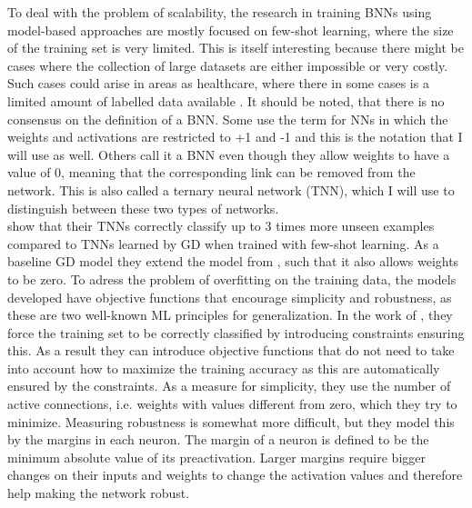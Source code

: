 \noindent To deal with the problem of scalability, the research in training BNNs using model-based approaches are mostly focused on few-shot learning, where the size of the training set is very limited. This is itself interesting because there might be cases where the collection of large datasets are either impossible or very costly. Such cases could arise in areas as healthcare, where there in some cases is a limited amount of labelled data available \citep{ching2017}. It should be noted, that there is no consensus on the definition of a BNN. Some use the term for NNs in which the weights and activations are restricted to +1 and -1 and this is the notation that I will use as well. Others call it a BNN even though they allow weights to have a value of 0, meaning that the corresponding link can be removed from the network. This is also called a ternary neural network (TNN), which I will use to distinguish between these two types of networks. \\

\noindent \cite{icarte2019} show that their TNNs correctly classify up to 3 times more unseen examples compared to TNNs learned by GD when trained with few-shot learning. As a baseline GD model they extend the model from \cite{Hubara2016}, such that it also allows weights to be zero. To adress the problem of overfitting on the training data, the models developed have objective functions that encourage simplicity and robustness, as these are two well-known ML principles for generalization. In the work of \cite{icarte2019}, they force the training set to be correctly classified by introducing constraints ensuring this. As a result they can introduce objective functions that do not need to take into account how to maximize the training accuracy as this are automatically ensured by the constraints. As a measure for simplicity, they use the number of active connections, i.e. weights with values different from zero, which they try to minimize. Measuring robustness is somewhat more difficult, but they model this by the margins in each neuron. The margin of a neuron is defined to be the minimum absolute value of its preactivation. Larger margins require bigger changes on their inputs and weights to change the activation values and therefore help making the network robust. \\

